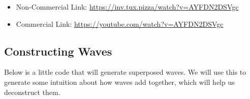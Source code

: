 \begin{itemize}
\tightlist
\item
  Non-Commercial Link: \url{https://inv.tux.pizza/watch?v=AYFDN2DSVgc}
\item
  Commercial Link: \url{https://youtube.com/watch?v=AYFDN2DSVgc}
\end{itemize}

\subsection{Constructing Waves}\label{constructing-waves}

Below is a little code that will generate superposed waves. We will use
this to generate some intuition about how waves add together, which will
help us deconstruct them.

\begin{Shaded}
\begin{Highlighting}[]
\OperatorTok{\%}

\OperatorTok{=}\NormalTok{,}\NormalTok{,}\NormalTok{)}
\OperatorTok{=} 
\OperatorTok{=} 
\OperatorTok{=} 

\OperatorTok{=} 
\OperatorTok{=} 
\OperatorTok{=} 

\OperatorTok{=}\OperatorTok{*}\OperatorTok{*}

\OperatorTok{=}\OperatorTok{*}\OperatorTok{*}
\OperatorTok{=}\OperatorTok{*}\OperatorTok{*}
\OperatorTok{=}\OperatorTok{*}\OperatorTok{*}
\OperatorTok{=}\OperatorTok{*}\OperatorTok{*}

\OperatorTok{=}\OperatorTok{+}
\OperatorTok{=}\OperatorTok{+}
\OperatorTok{=}\OperatorTok{+}
\OperatorTok{=}\OperatorTok{+}
\end{Highlighting}
\end{Shaded}

